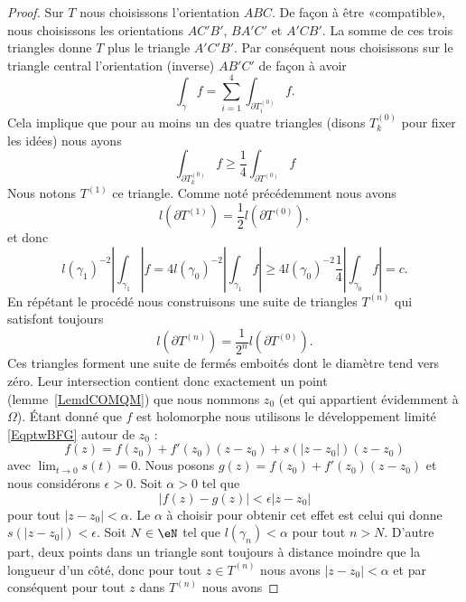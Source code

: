 \begin{proof}
	Sur \( T\) nous choisissons l'orientation \( ABC\). De façon à être «compatible», nous choisissons les orientations \( AC'B'\), \( BA'C'\) et \( A'CB'\). La somme de ces trois triangles donne \( T\) plus le triangle \( A'C'B'\). Par conséquent nous choisissons sur le triangle central l'orientation (inverse) \( AB'C'\) de façon à avoir
	\begin{equation}
		\int_{\gamma}f=\sum_{i=1}^4\int_{\partial T^{(0)}_i}f.
	\end{equation}
	Cela implique que pour au moins un des quatre triangles (disons \( T^{(0)}_k\) pour fixer les idées) nous ayons
	\begin{equation}
		\int_{\partial T^{(0)}_k}f\geq \frac{1}{ 4 }\int_{\partial T^{(0)}}f
	\end{equation}
	Nous notons \( T^{(1)}\) ce triangle. Comme noté précédemment nous avons
	\begin{equation}
		l(\partial T^{(1)})=\frac{ 1 }{2}l(\partial T^{(0)}),
	\end{equation}
	et donc
	\begin{equation}
		l(\gamma_1)^{-2}| \int_{\gamma_1} |f=4l(\gamma_0)^{-2}| \int_{\gamma_1}f |\geq 4l(\gamma_0)^{-2}\frac{1}{ 4 }| \int_{\gamma_0}f |=c.
	\end{equation}
	En répétant le procédé nous construisons une suite de triangles \( T^{(n)}\) qui satisfont toujours
	\begin{equation}
		l(\partial T^{(n)})=\frac{1}{ 2^n }l(\partial T^{(0)}).
	\end{equation}
	Ces triangles forment une suite de fermés emboités dont le diamètre tend vers zéro. Leur intersection contient donc exactement un point (lemme~\ref{LemdCOMQM}) que nous nommons \( z_0\) (et qui appartient évidemment à \( \Omega\)). Étant donné que \( f\) est holomorphe nous utilisons le développement limité \eqref{EqptwBFG} autour de \( z_0\) :
	\begin{equation}
		f(z)=f(z_0)+f'(z_0)(z-z_0)+s(| z-z_0 |)(z-z_0)
	\end{equation}
	avec \( \lim_{t\to 0} s(t)=0\). Nous posons \( g(z)=f(z_0)+f'(z_0)(z-z_0)\) et nous considérons \( \epsilon>0\). Soit \( \alpha>0\) tel que
	\begin{equation}
		| f(z)-g(z) |<\epsilon| z-z_0 |
	\end{equation}
	pour tout \( | z-z_0 |<\alpha\). Le \( \alpha\) à choisir pour obtenir cet effet est celui qui donne \( s(| z-z_0 |)<\epsilon\). Soit \( N\in \eN\) tel que \( l(\gamma_n)<\alpha\) pour tout \( n>N\). D'autre part, deux points dans un triangle sont toujours à distance moindre que la longueur d'un côté, donc pour tout \( z\in T^{(n)}\) nous avons \( | z-z_0 |<\alpha\) et par conséquent pour tout \( z\) dans \( T^{(n)}\) nous avons

\end{proof}
